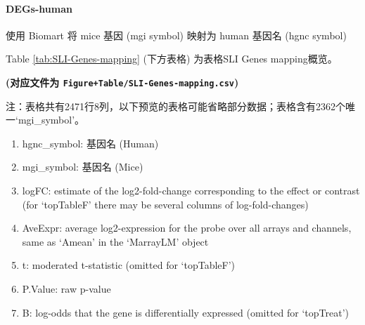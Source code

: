 \documentclass[
]{article}
\providecommand{\tightlist}{%
  \setlength{\itemsep}{0pt}\setlength{\parskip}{0pt}}
\begin{document}
\hypertarget{degs-human}{%
\paragraph{DEGs-human}\label{degs-human}}

使用 Biomart 将 mice 基因 (mgi symbol) 映射为 human 基因名 (hgnc symbol)

Table \ref{tab:SLI-Genes-mapping} (下方表格) 为表格SLI Genes mapping概览。

\textbf{(对应文件为 \texttt{Figure+Table/SLI-Genes-mapping.csv})}

\begin{center}\begin{tcolorbox}[colback=gray!10, colframe=gray!50, width=0.9\linewidth, arc=1mm, boxrule=0.5pt]注：表格共有2471行8列，以下预览的表格可能省略部分数据；表格含有2362个唯一`mgi\_symbol'。
\end{tcolorbox}
\end{center}
\begin{center}\begin{tcolorbox}[colback=gray!10, colframe=gray!50, width=0.9\linewidth, arc=1mm, boxrule=0.5pt]\begin{enumerate}\tightlist
\item hgnc\_symbol:  基因名 (Human)
\item mgi\_symbol:  基因名 (Mice)
\item logFC:  estimate of the log2-fold-change corresponding to the effect or contrast (for ‘topTableF’ there may be several columns of log-fold-changes)
\item AveExpr:  average log2-expression for the probe over all arrays and channels, same as ‘Amean’ in the ‘MarrayLM’ object
\item t:  moderated t-statistic (omitted for ‘topTableF’)
\item P.Value:  raw p-value
\item B:  log-odds that the gene is differentially expressed (omitted for ‘topTreat’)
\end{enumerate}\end{tcolorbox}
\end{center}
\end{document}
